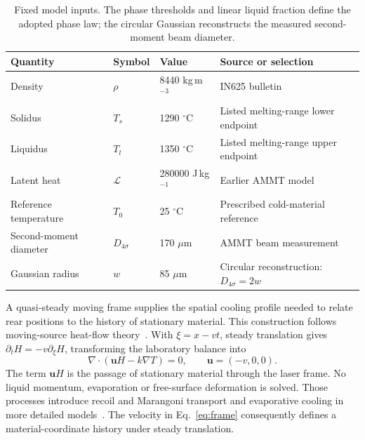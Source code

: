 \documentclass[preprint,12pt]{elsarticle}
\newcommand{\um}{\ensuremath{\mu\mathrm{m}}}
\begin{document}
\begin{table}[htbp]
\centering
\small
\caption{Fixed model inputs. The phase thresholds and linear liquid fraction define the adopted phase law; the circular Gaussian reconstructs the measured second-moment beam diameter.}
\label{tab:model-inputs}
\begin{tabular}{llll}
\toprule
Quantity & Symbol & Value & Source or selection\\
\midrule
Density & $\rho$ & 8440 kg\,m$^{-3}$ & IN625 bulletin~\cite{specialmetals625}\\
Solidus & $T_s$ & 1290 $^\circ$C & Listed melting-range lower endpoint~\cite{specialmetals625}\\
Liquidus & $T_l$ & 1350 $^\circ$C & Listed melting-range upper endpoint~\cite{specialmetals625}\\
Latent heat & $\mathcal L$ & 280000 J\,kg$^{-1}$ & Earlier AMMT model~\cite{kollmannsberger2019}\\
Reference temperature & $T_0$ & 25 $^\circ$C & Prescribed cold-material reference\\
Second-moment diameter & $D_{4\sigma}$ & 170 \um{} & AMMT beam measurement~\cite{lane2020}\\
Gaussian radius & $w$ & 85 \um{} & Circular reconstruction: $D_{4\sigma}=2w$\\
\bottomrule
\end{tabular}
\end{table}

A quasi-steady moving frame supplies the spatial cooling profile needed to relate rear positions to the history of stationary material. This construction follows moving-source heat-flow theory~\cite{rosenthal1946}. With $\xi=x-vt$, steady translation gives $\partial_tH=-v\partial_\xi H$, transforming the laboratory balance into
\begin{equation}
 \nabla\cdot(\bm uH-k\nabla T)=0,\qquad \bm u=(-v,0,0).
 \label{eq:frame}
\end{equation}
The term $\bm uH$ is the passage of stationary material through the laser frame. No liquid momentum, evaporation or free-surface deformation is solved. Those processes introduce recoil and Marangoni transport and evaporative cooling in more detailed models~\cite{khairallah2016}. The velocity in Eq.~\eqref{eq:frame} consequently defines a material-coordinate history under steady translation.
\end{document}
